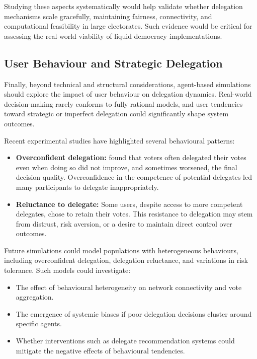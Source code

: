 Studying these aspects systematically would help validate whether delegation mechanisms scale gracefully, maintaining fairness, connectivity, and computational feasibility in large electorates. Such evidence would be critical for assessing the real-world viability of liquid democracy implementations.

\subsection{User Behaviour and Strategic Delegation}

Finally, beyond technical and structural considerations, agent-based simulations should explore the impact of user behaviour on delegation dynamics. Real-world decision-making rarely conforms to fully rational models, and user tendencies toward strategic or imperfect delegation could significantly shape system outcomes.

Recent experimental studies have highlighted several behavioural patterns:

\begin{itemize}
\item \textbf{Overconfident delegation:} \citet{casella2023liquid} found that voters often delegated their votes even when doing so did not improve, and sometimes worsened, the final decision quality. Overconfidence in the competence of potential delegates led many participants to delegate inappropriately.
\item \textbf{Reluctance to delegate:} Some users, despite access to more competent delegates, chose to retain their votes. This resistance to delegation may stem from distrust, risk aversion, or a desire to maintain direct control over outcomes.
\end{itemize}

Future simulations could model populations with heterogeneous behaviours, including overconfident delegation, delegation reluctance, and variations in risk tolerance. Such models could investigate:

\begin{itemize}
\item The effect of behavioural heterogeneity on network connectivity and vote aggregation.
\item The emergence of systemic biases if poor delegation decisions cluster around specific agents.
\item Whether interventions such as delegate recommendation systems could mitigate the negative effects of behavioural tendencies.
\end{itemize}

